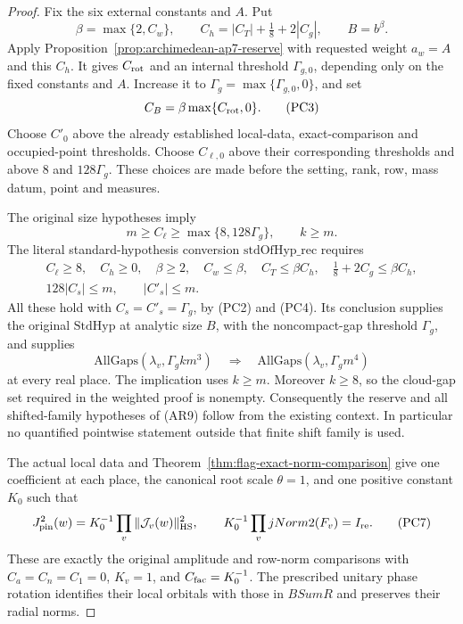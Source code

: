 \begin{proof}
Fix the six external constants and \(A\). Put
\[
 \beta=\max\{2,C_w\},\qquad
 C_h=|C_T|+\tfrac18+2|C_g|,\qquad B=b^\beta.
                                                        \tag{PC2}
\]
Apply Proposition~\ref{prop:archimedean-ap7-reserve} with
requested weight \(a_w=A\) and this \(C_h\).
It gives \(C_{\rm rot}\) and an internal threshold
\(\Gamma_{g,0}\), depending only on the fixed constants
and \(A\). Increase it to
\(\Gamma_g=\max\{\Gamma_{g,0},0\}\), and set
\[
                 C_B=\beta\max\{C_{\rm rot},0\}.
                                                        \tag{PC3}
\]
Choose \(C'_0\) above the already established local-data,
exact-comparison and occupied-point thresholds. Choose
\(C_{\ell,0}\) above their corresponding thresholds and
above \(8\) and \(128\Gamma_g\).
These choices are made before the setting, rank, row, mass
datum, point and measures.

The original size hypotheses imply
\[
       m\ge C_\ell\ge\max\{8,128\Gamma_g\},
                         \qquad k\ge m.
                                                        \tag{PC4}
\]
The literal standard-hypothesis conversion
\(\mathrm{stdOfHyp\_rec}\) requires
\[
\begin{gathered}
 C_\ell\ge8,\quad C_h\ge0,\quad \beta\ge2,
 \quad C_w\le\beta,\quad C_T\le\beta C_h,
 \quad \tfrac18+2C_g\le\beta C_h,\\
              128|C_s|\le m,\qquad |C'_s|\le m.
\end{gathered}                                         \tag{PC5}
\]
All these hold with \(C_s=C'_s=\Gamma_g\), by (PC2)
and (PC4). Its conclusion supplies the original
\(\mathrm{StdHyp}\) at analytic size \(B\), with the
noncompact-gap threshold \(\Gamma_g\), and supplies
\[
       \mathrm{AllGaps}(\lambda_v,\Gamma_g k m^3)
       \quad\Longrightarrow\quad
       \mathrm{AllGaps}(\lambda_v,\Gamma_g m^4)
                                                        \tag{PC6}
\]
at every real place. The implication uses \(k\ge m\).
Moreover \(k\ge8\), so the cloud-gap set required in the
weighted proof is nonempty. Consequently the reserve
and all shifted-family hypotheses of (AR9) follow from
the existing context. In particular no quantified pointwise
statement outside that finite shift family is used.

The actual local data and
Theorem~\ref{thm:flag-exact-norm-comparison} give one
coefficient at each place, the canonical root scale
\(\theta=1\), and one positive constant \(K_0\) such that
\[
 J_{\rm pin}^2(w)
       =K_0^{-1}\prod_v\|\mathcal J_v(w)\|_{\rm HS}^2,
 \qquad
 K_0^{-1}\prod_v jNorm2(F_v)=I_{\rm re}.
                                                        \tag{PC7}
\]
These are exactly the original amplitude and row-norm
comparisons with \(C_a=C_n=C_1=0\), \(K_v=1\), and
\(C_{\rm fac}=K_0^{-1}\). The prescribed unitary phase
rotation identifies their local orbitals with those in
\(BSumR\) and preserves their radial norms.


\end{proof}
